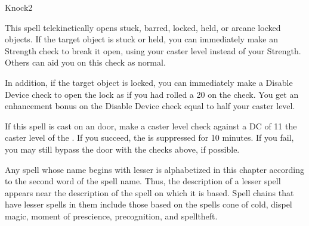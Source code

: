 \begin{spellsection}{Knock}{2}
\begin{spellheader}
\end{spellheader}
\begin{spellcontent}
    \begin{spelltargetinginfo}
    \end{spelltargetinginfo}
    \begin{spelleffects}
        \spelleffect This spell telekinetically opens stuck, barred, locked, held, or arcane locked objects. If the target object is stuck or held, you can immediately make an Strength check to break it open, using your caster level instead of your Strength. Others can aid you on this check as normal.
        
        In addition, if the target object is locked, you can immediately make a Disable Device check to open the lock as if you had rolled a 20 on the check. You get an enhancement bonus on the Disable Device check equal to half your caster level.
    \end{spelleffects}
\end{spellcontent}
\begin{spellfooter}
    \spellnotes If this spell is cast on an  door, make a caster level check against a DC of 11 \add the caster level of the . If you succeed, the  is suppressed for 10 minutes. If you fail, you may still bypass the door with the checks above, if possible.
\end{spellfooter}
\end{spellsection}

\par Any spell whose name begins with lesser is alphabetized in this chapter according to the second word of the spell name. Thus, the description of a lesser spell appears near the description of the spell on which it is based. Spell chains that have lesser spells in them include those based on the spells cone of cold, dispel magic, moment of prescience, precognition, and spelltheft.

